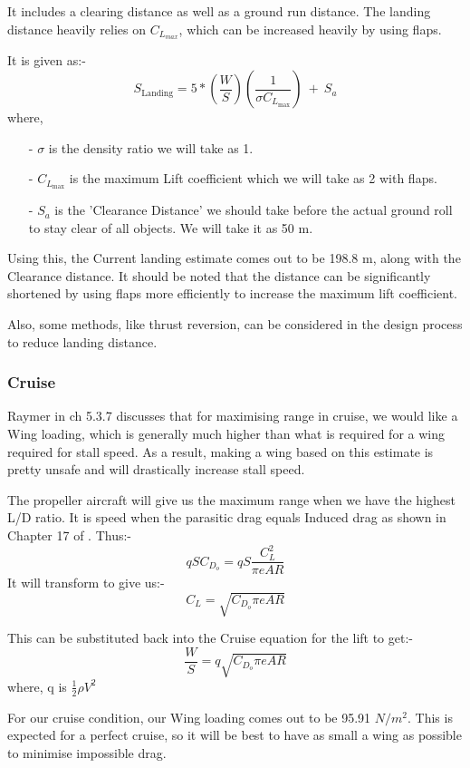 \documentclass[12 pt]{article}
\begin{document}
It includes a clearing distance as well as a ground run distance. The landing distance heavily relies on $C_{L_{max}}$, which can be increased heavily by using flaps.

It is given as:- 
$$ S_{\text{Landing}} = 5*\left( \frac{W}{S} \right) \left( \frac{1}{\sigma C_{L_{\text{max}}}} \right) \: + \: S_a$$
where,
\begin{itemize}
    \item [-] $\sigma$ is the density ratio we will take as 1.
    \item[-] $C_{L_{\text{max}}} $ is the maximum Lift coefficient which we will take as 2 with flaps.
    \item[-] $S_a$ is the 'Clearance Distance' we should take before the actual ground roll to stay clear of all objects. We will take it as 50 m.
\end{itemize}

Using this, the Current landing estimate comes out to be 198.8 m, along with the Clearance distance. It should be noted that the distance can be significantly shortened by using flaps more efficiently to increase the maximum lift coefficient.

Also, some methods, like thrust reversion, can be considered in the design process to reduce landing distance.


\subsubsection{Cruise}

Raymer in \cite{Raymer.2006} ch 5.3.7 discusses that for maximising range in cruise, we would like a Wing loading, which is generally much higher than what is required for a wing required for stall speed. As a result, making a wing based on this estimate is pretty unsafe and will drastically increase stall speed.

The propeller aircraft will give us the maximum range when we have the highest L/D ratio. It is speed when the parasitic drag equals Induced drag as shown in Chapter 17 of \cite{Raymer.2006}. Thus:-
$$qSC_{D_o} = qS\frac{C_L^2}{\pi e AR}$$
It will transform to give us:- 
$$ C_L = \sqrt{C_{D_o} \pi e AR }$$

This can be substituted back into the Cruise equation for the lift to get:-
$$ \frac{W}{S} = q \sqrt{C_{D_o} \pi e AR}$$
where, q is $\frac{1}{2} \rho V^2 $

For our cruise condition, our Wing loading comes out to be 95.91 $N/m^2$. This is expected for a perfect cruise, so it will be best to have as small a wing as possible to minimise impossible drag.
\end{document}
